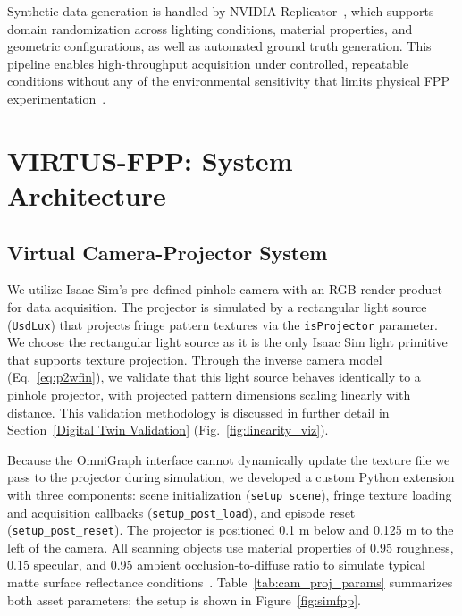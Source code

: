 \documentclass[journal,twoside,web]{ieeecolor}
\begin{document}
Synthetic data generation is handled by NVIDIA Replicator~\cite{replicator_docs}, which
supports domain randomization across lighting conditions, material properties, and geometric
configurations, as well as automated ground truth generation.
This pipeline enables high-throughput acquisition under controlled, repeatable conditions
without any of the environmental sensitivity that limits physical FPP
experimentation~\cite{feng2021calibration}.

\section{VIRTUS-FPP: System Architecture} \label{experiments}

\subsection{Virtual Camera-Projector System}

We utilize Isaac Sim's pre-defined pinhole camera with an RGB render product for data
acquisition.
The projector is simulated by a rectangular light source (\texttt{UsdLux}) that projects
fringe pattern textures via the \texttt{isProjector} parameter. We choose the rectangular light source as it is the only Isaac Sim light primitive that supports texture projection. Through the inverse camera model 
(Eq.~\ref{eq:p2wfin}), we validate that this light source behaves identically to a pinhole 
projector, with projected pattern dimensions scaling linearly with distance. This validation methodology is discussed in further detail in Section~\ref{Digital Twin Validation} (Fig.~\ref{fig:linearity_viz}).

Because the OmniGraph interface cannot dynamically update the texture file we pass to the projector during simulation,
we developed a custom Python extension with three components: scene initialization
(\texttt{setup\_scene}), fringe texture loading and acquisition callbacks
(\texttt{setup\_post\_load}), and episode reset (\texttt{setup\_post\_reset}).
The projector is positioned 0.1 m below and 0.125 m to the left of the camera.
All scanning objects use material properties of 0.95 roughness, 0.15 specular, and 0.95
ambient occlusion-to-diffuse ratio to simulate typical matte surface reflectance
conditions~\cite{mi13101607,ma16155443,wei2014experimental}.
Table~\ref{tab:cam_proj_params} summarizes both asset parameters; the setup is shown in
Figure~\ref{fig:simfpp}.
\end{document}
